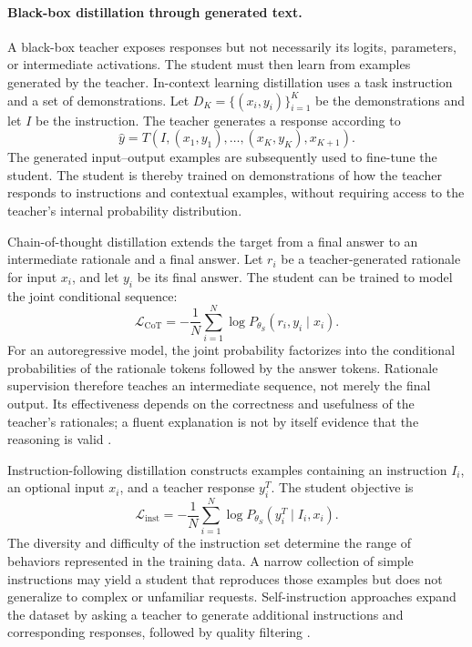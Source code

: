 \paragraph{Black-box distillation through generated text.}
A black-box teacher exposes responses but not necessarily its logits,
parameters, or intermediate activations.  The student must then learn from
examples generated by the teacher.  In-context learning distillation uses a
task instruction and a set of demonstrations.  Let
\(D_K=\{(x_i,y_i)\}_{i=1}^{K}\) be the demonstrations and let
\(I\) be the instruction.  The teacher generates a response according to
\begin{equation}
    \widehat y
    =T\left(I,(x_1,y_1),\ldots,(x_K,y_K),x_{K+1}\right).
    \label{eq:distillation-icl-generation}
\end{equation}
The generated input--output examples are subsequently used to fine-tune the
student.  The student is thereby trained on demonstrations of how the teacher
responds to instructions and contextual examples, without requiring access
to the teacher's internal probability distribution.

Chain-of-thought distillation extends the target from a final answer to an
intermediate rationale and a final answer.  Let \(r_i\) be a teacher-generated
rationale for input \(x_i\), and let \(y_i\) be its final answer.  The student
can be trained to model the joint conditional sequence:
\begin{equation}
    \mathcal L_{\mathrm{CoT}}
    =-\frac{1}{N}\sum_{i=1}^{N}
    \log P_{\theta_S}(r_i,y_i\mid x_i).
    \label{eq:distillation-cot-loss}
\end{equation}
For an autoregressive model, the joint probability factorizes into the
conditional probabilities of the rationale tokens followed by the answer
tokens.  Rationale supervision therefore teaches an intermediate sequence,
not merely the final output.  Its effectiveness depends on the correctness
and usefulness of the teacher's rationales; a fluent explanation is not by
itself evidence that the reasoning is valid
\parencite{Yang2024SurveyKD,Fang2026KnowledgeDatasetDistillation}.

Instruction-following distillation constructs examples containing an
instruction \(I_i\), an optional input \(x_i\), and a teacher response
\(y_i^T\).  The student objective is
\begin{equation}
    \mathcal L_{\mathrm{inst}}
    =-\frac{1}{N}\sum_{i=1}^{N}
    \log P_{\theta_S}(y_i^T\mid I_i,x_i).
    \label{eq:distillation-instruction-loss}
\end{equation}
The diversity and difficulty of the instruction set determine the range of
behaviors represented in the training data.  A narrow collection of simple
instructions may yield a student that reproduces those examples but does not
generalize to complex or unfamiliar requests.  Self-instruction approaches
expand the dataset by asking a teacher to generate additional instructions
and corresponding responses, followed by quality filtering
\parencite{Yang2024SurveyKD}.

